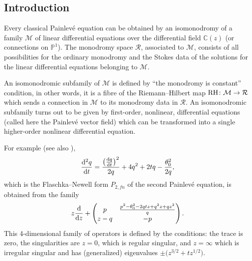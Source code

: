 \documentclass[pdftex]{sigma}
\numberwithin{equation}{section}
\begin{document}
\subsection{Introduction}\label{FlNe}
Every classical Painlev\'e equation can be obtained by an isomonodromy of a family $\mathcal{M}$ of linear differential equations over the differential field $\mathbb{C}(z)$ \big(or connections on $\mathbb{P}^1$\big). The monodromy space $\mathcal{R}$, associated to $\mathcal{M}$, consists of all possibilities for the ordinary monodromy and the Stokes data of the solutions for the linear differential equations
belonging to $\mathcal{M}$.

An isomonodromic subfamily of $\mathcal{M}$ is defined by ``the monodromy is constant'' condition, in other words, it is
a fibre of the Riemann--Hilbert map ${\rm RH}\colon \mathcal{M}\rightarrow \mathcal{R}$ which sends a connection in $\mathcal{M}$
to its monodromy data in $\mathcal{R}$.
An isomonodromic subfamily turns out to be given by first-order, nonlinear, differential equations
(called here the Painlev\'e vector field) which can be transformed into a single higher-order nonlinear differential equation.

For example (see also \cite[Section~4.9]{vdP-Sa}),
\[
\frac{{\rm d}^2q}{{\rm d}t}=\frac{\bigl(\frac{{\rm d}q}{{\rm d}t}\bigr)^2}{2q}+4q^2+2tq-\frac{\theta_0^2}{2q},
\]
 which is the Flaschka--Newell
form $P_{2,fn}$ of the second Painlev\'e equation, is obtained from the family \[z\frac{{\rm d}}{{\rm d}z}+ \left(\begin{matrix} p & \frac{p^2-\theta_0^2-2qtz+q^2z+qz^2}{q}\\ z-q & -p \end{matrix}\right). \]
This 4-dimensional family of operators is defined by the conditions:
the trace is zero, the singularities are $z=0$, which is regular singular, and $z=\infty$ which is irregular singular and
has (generalized) eigenvalues $\pm \bigl(z^{3/2}+tz^{1/2}\bigr)$.
\end{document}
